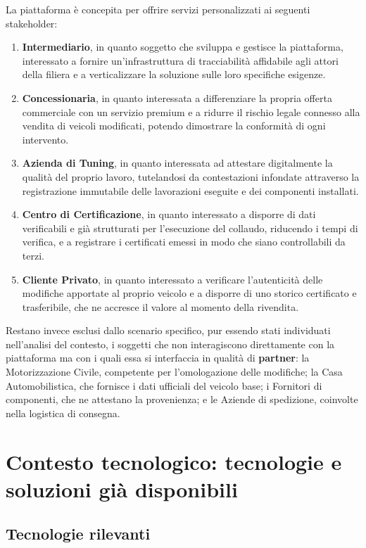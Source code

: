La piattaforma è concepita per offrire servizi personalizzati ai seguenti stakeholder:

\begin{enumerate}
    \item \textbf{Intermediario}, in quanto soggetto che sviluppa e gestisce la piattaforma, interessato a fornire un'infrastruttura di tracciabilità affidabile agli attori della filiera e a verticalizzare la soluzione sulle loro specifiche esigenze.
    \item \textbf{Concessionaria}, in quanto interessata a differenziare la propria offerta commerciale con un servizio premium e a ridurre il rischio legale connesso alla vendita di veicoli modificati, potendo dimostrare la conformità di ogni intervento.
    \item \textbf{Azienda di Tuning}, in quanto interessata ad attestare digitalmente la qualità del proprio lavoro, tutelandosi da contestazioni infondate attraverso la registrazione immutabile delle lavorazioni eseguite e dei componenti installati.
    \item \textbf{Centro di Certificazione}, in quanto interessato a disporre di dati verificabili e già strutturati per l'esecuzione del collaudo, riducendo i tempi di verifica, e a registrare i certificati emessi in modo che siano controllabili da terzi.
    \item \textbf{Cliente Privato}, in quanto interessato a verificare l'autenticità delle modifiche apportate al proprio veicolo e a disporre di uno storico certificato e trasferibile, che ne accresce il valore al momento della rivendita.
\end{enumerate}

Restano invece esclusi dallo scenario specifico, pur essendo stati individuati nell'analisi del contesto, i soggetti che non interagiscono direttamente con la piattaforma ma con i quali essa si interfaccia in qualità di \textbf{partner}: la Motorizzazione Civile, competente per l'omologazione delle modifiche; la Casa Automobilistica, che fornisce i dati ufficiali del veicolo base; i Fornitori di componenti, che ne attestano la provenienza; e le Aziende di spedizione, coinvolte nella logistica di consegna.

\section{Contesto tecnologico: tecnologie e soluzioni già disponibili}

\subsection{Tecnologie rilevanti}

